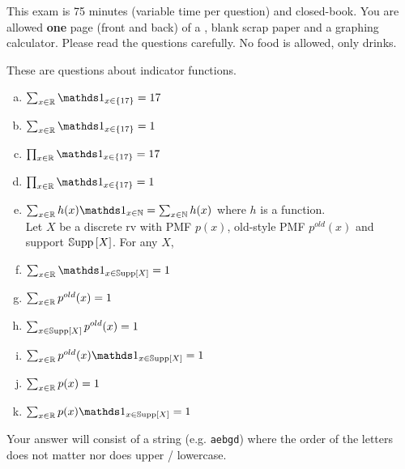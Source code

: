 \documentclass[12pt,landscape]{article}
\newcommand{\instr}{\small Your answer will consist of a string (e.g. \texttt{aebgd}) where the order of the letters does not matter nor does upper / lowercase. \normalsize}
\begin{document}
This exam is 75 minutes (variable time per question) and closed-book. You are allowed \textbf{one} page (front and back) of a , blank scrap paper and a graphing calculator. Please read the questions carefully. No food is allowed, only drinks. %

\pagebreak




\problem{} These are questions about indicator functions.
\vspace{-0.2cm}\benum{} 

\begin{enumerate}[(a)]
\item $\sum_{x \in \reals} \indic{x \in \braces{17}} = 17$
\item $\sum_{x \in \reals} \indic{x \in \braces{17}} = 1$
\item $\prod_{x \in \reals} \indic{x \in \braces{17}} = 17$
\item $\prod_{x \in \reals} \indic{x \in \braces{17}} = 1$
\item $\sum_{x \in \reals} h(x) \indic{x \in \naturals} = \sum_{x \in \naturals} h(x)$ where $h$ is a function. \\

Let $X$ be a discrete rv with PMF $p(x)$, old-style PMF $p^{old}(x)$ and support $\mathbb{S}\text{upp}\left[X\right]$. For any $X$,
\item $\sum_{x \in \reals} \indic{x \in \support{X}} = 1$

\item $\sum_{x \in \mathbb{R}} p^{old}(x) = 1$
\item $\sum_{x \in \mathbb{S}\text{upp}\left[X\right]} p^{old}(x) = 1$
\item $\sum_{x \in \reals} p^{old}(x) \indic{x \in \support{X}} = 1$

\item $\sum_{x \in \mathbb{R}} p(x) = 1$
\item $\sum_{x \in \reals} p(x) \indic{x \in \support{X}} = 1$
\end{enumerate}
\eenum\instr\pagebreak
\end{document}
